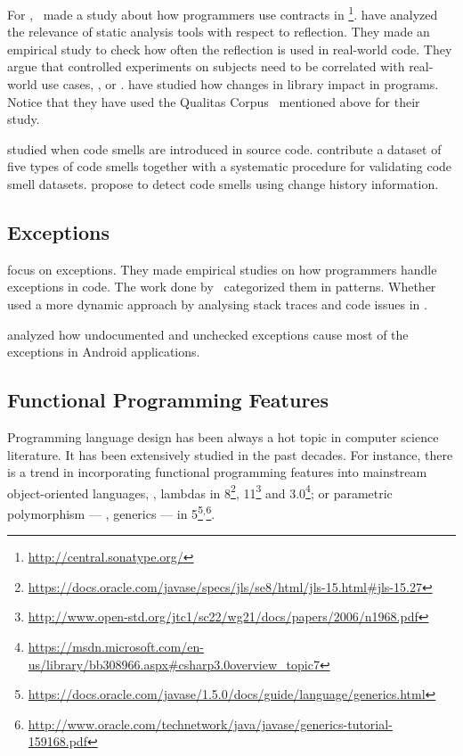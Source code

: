 For \java{},~\cite{dietrichContractsWildStudy2017a} made a study about how programmers use contracts in \mavencentral{}\footnote{\url{http://central.sonatype.org/}}.
\cite{landmanChallengesStaticAnalysis2017} have analyzed the relevance of static analysis tools with respect to reflection.
They made an empirical study to check how often the reflection \api{} is used in real-world code.
They argue that controlled experiments on subjects need to be correlated with real-world use cases, \eg{}, \github{} or \mavencentral{}.
\cite{dietrichBrokenPromisesEmpirical2014} have studied how changes in \api{} library impact in \java{} programs.
Notice that they have used the Qualitas Corpus~\cite{temperoQualitasCorpusCurated2010} mentioned above for their study.

\cite{tufanoWhenWhyYour2015,tufanoWhenWhyYour2017} studied when code smells are introduced in source code.
\cite{palombaLandfillOpenDataset2015}
contribute a dataset of five types of code smells together with a systematic procedure for validating code smell datasets.
\cite{palombaDetectingBadSmells2013} propose to detect code smells using change history information.

\subsection*{Exceptions}

\cite{keryExaminingProgrammerPractices2016,asaduzzamanHowDevelopersUse2016} focus on exceptions.
They made empirical studies on how programmers handle exceptions in \java{} code.
The work done by~\cite{nakshatriAnalysisExceptionHandling2016} categorized them in patterns.
Whether~\cite{coelhoUnveilingExceptionHandling2015} used a more dynamic approach by analysing stack traces and code issues in \github{}.

\cite{kechagiaUndocumentedUncheckedExceptions2014} analyzed how undocumented and
unchecked exceptions cause most of the exceptions in
Android applications.

\subsection*{Functional Programming Features}

Programming language design has been always a hot topic in computer science literature.
It has been extensively studied in the past decades.
For instance, there is a trend in incorporating functional programming features into mainstream object-oriented languages, \eg, lambdas in \java{} 8\footnote{\url{https://docs.oracle.com/javase/specs/jls/se8/html/jls-15.html\#jls-15.27}}, \cpp{}11\footnote{\url{http://www.open-std.org/jtc1/sc22/wg21/docs/papers/2006/n1968.pdf}} and \cs{} 3.0\footnote{\url{https://msdn.microsoft.com/en-us/library/bb308966.aspx\#csharp3.0overview\_topic7}}; or parametric polymorphism --- \ie{}, generics --- in \java{} 5\footnote{\url{https://docs.oracle.com/javase/1.5.0/docs/guide/language/generics.html}}\(^{,}\)\footnote{\url{http://www.oracle.com/technetwork/java/javase/generics-tutorial-159168.pdf}}.

